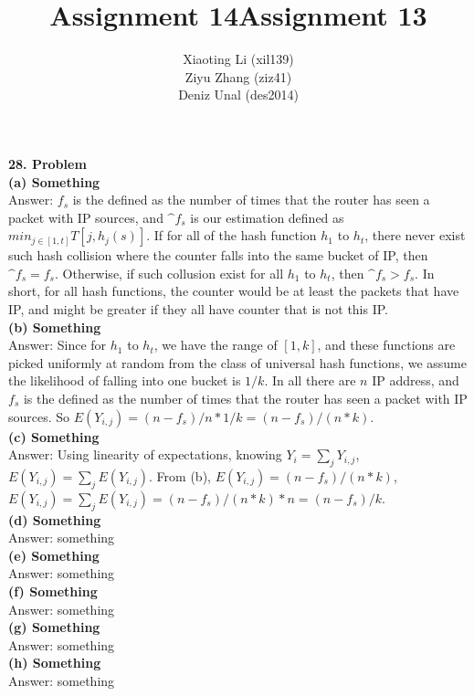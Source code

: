 \documentclass{article}
\title{Assignment 14}
\title{Assignment 13}
\author{Xiaoting Li (xil139) \\
Ziyu Zhang (ziz41) \\
Deniz Unal (des2014)}
\date{}
\begin{document}
\maketitle

\noindent
\textbf{28. Problem}\\ \newline
\textbf{(a) Something} \\ \newline
Answer: $f_s$ is the defined as the number of times that the router has seen a packet with IP sources, and $\^f_s$ is our estimation defined as $min_{j\in[1,t]}{T[j,h_j(s)]}$. If for all of the hash function $h_1$ to $h_t$, there never exist such hash collision where the counter falls into the same bucket of IP, then $\^f_s = f_s$. Otherwise, if such collusion exist for all $h_1$ to $h_t$, then $\^f_s > f_s$. In short, for all hash functions, the counter would be at least the packets that have IP, and might be greater if they all have counter that is not this IP.\\ \newline
\textbf{(b) Something}\\ \newline
Answer: Since for $h_1$ to $h_t$, we have the range of $[1,k]$, and these functions are picked uniformly at random from the class of universal hash functions, we assume the likelihood of falling into one bucket is $1/k$. In all there are $n$ IP address, and $f_s$ is the defined as the number of times that the router has seen a packet with IP sources. So $E(Y_{i,j}) =(n-f_s)/n * 1/k = (n-f_s)/(n*k)$.\\ \newline
\textbf{(c) Something} \\ \newline
Answer: Using linearity of expectations, knowing $Y_i = \sum_{j} Y_{i,j}$, $E(Y_{i,j}) =  \sum_{j} E(Y_{i,j})$. From (b), $E(Y_{i,j}) = (n-f_s)/(n*k)$,  $E(Y_{i,j}) =  \sum_{j} E(Y_{i,j}) =(n-f_s)/(n*k) * n =  (n-f_s)/k$.\\ \newline
\textbf{(d) Something} \\ \newline
Answer: something\\ \newline
\textbf{(e) Something} \\ \newline
Answer: something\\ \newline
\textbf{(f) Something} \\ \newline
Answer: something\\ \newline
\textbf{(g) Something} \\ \newline
Answer: something\\ \newline
\textbf{(h) Something} \\ \newline
Answer: something\\ \newline
\end{document}
